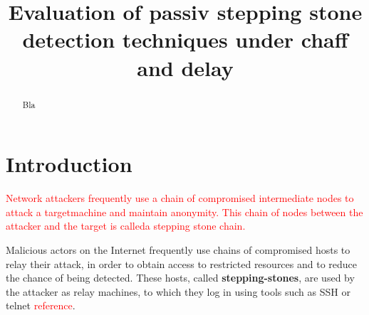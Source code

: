 \documentclass[conference]{IEEEtran}\usepackage[]{graphicx}\usepackage[]{color}
\begin{document}
\title{Evaluation of passiv stepping stone detection techniques under chaff and delay}


\author{
\and
{}
\and
{}
}


\IEEEoverridecommandlockouts
\makeatletter{}\makeatother
{}


\maketitle          

\begin{abstract}

Bla
\end{abstract}


\section{Introduction}

\textcolor{red}{Network attackers frequently use a chain of compromised intermediate nodes to attack a targetmachine and maintain anonymity. This chain of nodes between the attacker and the target is calleda stepping stone chain. }


Malicious actors on the Internet frequently use chains of compromised hosts to relay their attack, in order to obtain access to restricted resources and to reduce the chance of being detected. These hosts, called \textbf{stepping-stones}, are used by the attacker as relay machines, to which they log in using tools such as SSH or telnet \textcolor{red}{reference}. 
\end{document}
